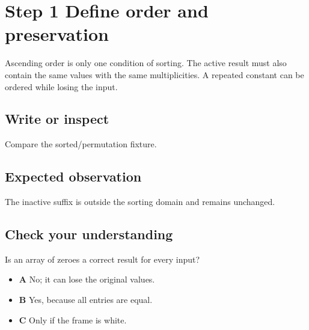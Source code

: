 \section{Step 1 Define order and
  preservation}\label{009-sorting-visualizer-s01-step-1-define-order-and-preservation}

Ascending order is only one condition of sorting. The active result must
also contain the same values with the same multiplicities. A repeated
constant can be ordered while losing the input.

\subsection{Write or
  inspect}\label{009-sorting-visualizer-s01-write-or-inspect}

Compare the sorted/permutation fixture.

\subsection{Expected
  observation}\label{009-sorting-visualizer-s01-expected-observation}

The inactive suffix is outside the sorting domain and remains unchanged.

\subsection{Check your
  understanding}\label{009-sorting-visualizer-s01-check-your-understanding}

Is an array of zeroes a correct result for every input?

\begin{itemize}
  \tightlist
  \item
        \textbf{A} No; it can lose the original values.
  \item
        \textbf{B} Yes, because all entries are equal.
  \item
        \textbf{C} Only if the frame is white.
\end{itemize}

